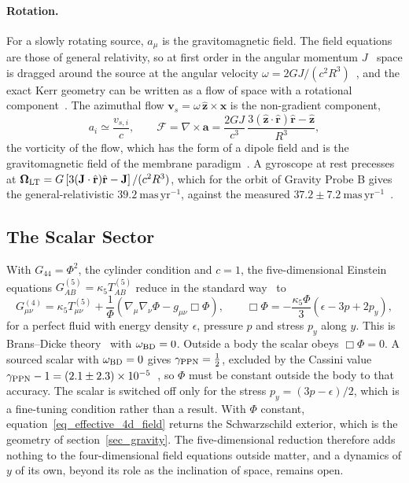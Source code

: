 \documentclass{iopjournal}
\begin{document}
\paragraph{Rotation.} For a slowly rotating source, $a_\mu$ is the gravitomagnetic field. The field equations are those of general relativity, so at first order in the angular momentum $J$~\cite{Hartle1967} space is dragged around the source at the angular velocity $\omega=2GJ/(c^2R^3)$~\cite{LenseThirring1918}, and the exact Kerr geometry can be written as a flow of space with a rotational component~\cite{Doran2000}. The azimuthal flow $\mathbf{v}_s=\omega\,\hat{\mathbf{z}}\times\mathbf{x}$ is the non-gradient component,
\begin{equation}\label{eq_nongradient_flow}
    a_i\simeq\frac{v_{s,i}}{c},
    \qquad
    \mathcal{F}=\nabla\times\mathbf{a}=\frac{2GJ}{c^3}\,\frac{3(\hat{\mathbf{z}}\cdot\hat{\mathbf{r}})\hat{\mathbf{r}}-\hat{\mathbf{z}}}{R^3},
\end{equation}
the vorticity of the flow, which has the form of a dipole field and is the gravitomagnetic field of the membrane paradigm~\cite{ThorneMembrane1986}. A gyroscope at rest precesses at $\boldsymbol{\Omega}_{\rm LT}=G\left[3(\mathbf{J}\cdot\hat{\mathbf{r}})\hat{\mathbf{r}}-\mathbf{J}\right]/(c^2R^3)$, which for the orbit of Gravity Probe B gives the general-relativistic $39.2~\mathrm{mas\,yr^{-1}}$, against the measured $37.2\pm7.2~\mathrm{mas\,yr^{-1}}$~\cite{Everitt2011GPB}.

\subsection{The Scalar Sector}

With $G_{44}=\Phi^2$, the cylinder condition and $c=1$, the five-dimensional Einstein equations $G^{(5)}_{AB}=\kappa_5T^{(5)}_{AB}$ reduce in the standard way~\cite{OverduinWesson1997} to
\begin{equation}\label{eq_effective_4d_field}
    G^{(4)}_{\mu\nu}=\kappa_5T^{(5)}_{\mu\nu}+\frac{1}{\Phi}\left(\nabla_\mu\nabla_\nu\Phi-g_{\mu\nu}\Box\Phi\right),
    \qquad
    \Box\Phi=-\frac{\kappa_5\Phi}{3}\left(\epsilon-3p+2p_y\right),
\end{equation}
for a perfect fluid with energy density $\epsilon$, pressure $p$ and stress $p_y$ along $y$. This is Brans--Dicke theory~\cite{BransDicke1961} with $\omega_{\rm BD}=0$. Outside a body the scalar obeys $\Box\Phi=0$. A sourced scalar with $\omega_{\rm BD}=0$ gives $\gamma_{\rm PPN}=\tfrac12$, excluded by the Cassini value $\gamma_{\rm PPN}-1=(2.1\pm2.3)\times10^{-5}$~\cite{Bertotti2003}, so $\Phi$ must be constant outside the body to that accuracy. The scalar is switched off only for the stress $p_y=(3p-\epsilon)/2$, which is a fine-tuning condition rather than a result. With $\Phi$ constant, equation~\eqref{eq_effective_4d_field} returns the Schwarzschild exterior, which is the geometry of section~\ref{sec_gravity}. The five-dimensional reduction therefore adds nothing to the four-dimensional field equations outside matter, and a dynamics of $y$ of its own, beyond its role as the inclination of space, remains open.
\end{document}
